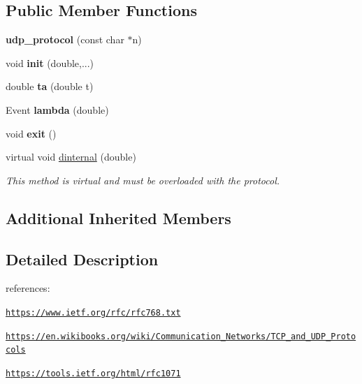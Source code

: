 \subsection*{Public Member Functions}
\begin{DoxyCompactItemize}
\item 
{\bfseries udp\+\_\+protocol} (const char $\ast$n)\hypertarget{classudp__protocol_ad529c38561902f0f24188598318df947}{}\label{classudp__protocol_ad529c38561902f0f24188598318df947}

\item 
void {\bfseries init} (double,...)\hypertarget{classudp__protocol_a8fc19f814928610c72872e3637be865a}{}\label{classudp__protocol_a8fc19f814928610c72872e3637be865a}

\item 
double {\bfseries ta} (double t)\hypertarget{classudp__protocol_a5b8647bdf5061a99f99f2ff69c881c54}{}\label{classudp__protocol_a5b8647bdf5061a99f99f2ff69c881c54}

\item 
Event {\bfseries lambda} (double)\hypertarget{classudp__protocol_a98590d58898aef5a38664e1eeeac5b34}{}\label{classudp__protocol_a98590d58898aef5a38664e1eeeac5b34}

\item 
void {\bfseries exit} ()\hypertarget{classudp__protocol_a10236c5fc7df21f08c5d31f9941a69e2}{}\label{classudp__protocol_a10236c5fc7df21f08c5d31f9941a69e2}

\item 
virtual void \hyperlink{classudp__protocol_aab75d26186e52fc49ba9f8b88fba0071}{dinternal} (double)
\begin{DoxyCompactList}\small\item\em This method is virtual and must be overloaded with the protocol. \end{DoxyCompactList}\end{DoxyCompactItemize}
\subsection*{Additional Inherited Members}


\subsection{Detailed Description}
references\+:
\begin{DoxyItemize}
\item \href{https://www.ietf.org/rfc/rfc768.txt}{\tt https\+://www.\+ietf.\+org/rfc/rfc768.\+txt}
\item \href{https://en.wikibooks.org/wiki/Communication_Networks/TCP_and_UDP_Protocols}{\tt https\+://en.\+wikibooks.\+org/wiki/\+Communication\+\_\+\+Networks/\+T\+C\+P\+\_\+and\+\_\+\+U\+D\+P\+\_\+\+Protocols}
\item \href{https://tools.ietf.org/html/rfc1071}{\tt https\+://tools.\+ietf.\+org/html/rfc1071} 
\end{DoxyItemize}

